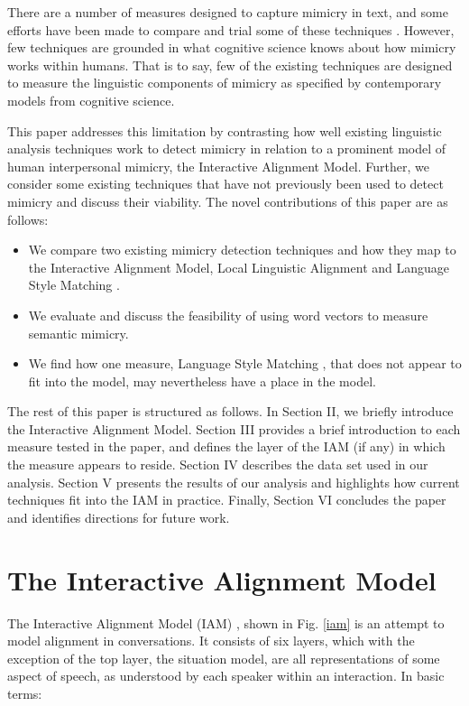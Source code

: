 \documentclass[conference]{IEEEtran}
\begin{document}
There are a number of measures designed to capture mimicry in text, and some efforts have been made to compare and trial some of these techniques \cite{xu2015evaluation}. However, few techniques are grounded in what cognitive  science knows about how mimicry works within humans. That is to say, few of the existing techniques are designed to measure the linguistic components of mimicry as specified by contemporary models from cognitive science.

This paper addresses this limitation by contrasting how well existing linguistic analysis techniques work to detect mimicry in relation to a prominent model of human interpersonal mimicry, the Interactive Alignment Model. Further, we consider some existing techniques that have not previously been used to detect mimicry and discuss their viability. The novel contributions of this paper are as follows:
\begin{itemize}
	\item We compare two existing mimicry detection techniques and how they map to the Interactive Alignment Model, Local Linguistic Alignment \cite{wang2014linguistic} and Language Style Matching \cite{ireland2010language}.
	\item  We evaluate and discuss the feasibility of using word vectors \cite{mikolov2013efficient} to measure semantic mimicry.
	\item We find how one measure, Language Style Matching \cite{ireland2010language}, that does not appear to fit into the model, may nevertheless have a place in the model.
\end{itemize}

The rest of this paper is structured as follows. In Section II, we briefly introduce the Interactive Alignment Model. Section III provides a brief introduction to each measure tested in the paper, and defines the layer of the IAM (if any) in which the measure appears to reside. Section IV describes the data set used in our analysis. Section V presents the results of our analysis and highlights how current techniques fit into the IAM in practice. Finally, Section VI concludes the paper and identifies directions for future work.


\section{The Interactive Alignment Model}
The Interactive Alignment Model (IAM) \cite{pickering2004toward}, shown in Fig. \ref{iam} is an attempt to model alignment in conversations. It consists of six layers, which with the exception of the top layer, the situation model, are all representations of some aspect of speech, as understood by each speaker within an interaction. In basic terms:
\end{document}
